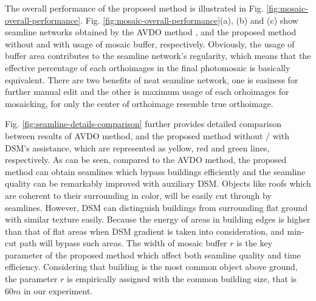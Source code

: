 \documentclass[journal]{IEEEtran}
\begin{document}
The overall performance of the proposed method is illustrated in Fig. \ref{fig:mosaic-overall-performance}. Fig. \ref{fig:mosaic-overall-performance}(a), (b) and (c) show seamline networks obtained by the AVDO method \cite{Pan2009}, and the proposed method without and with usage of mosaic buffer, respectively. Obviously, the usage of buffer area contributes to the seamline network's regularity, which means that the effective percentage of each orthoimages in the final photomosaic is basically equivalent. There are two benefits of neat seamline network, one is easiness for further manual edit and the other is maximum usage of each orhoimages for mosaicking, for only the center of orthoimage resemble true orthoimage.

Fig. \ref{fig:seamline-details-comparison} further provides detailed comparison between results of AVDO method, and the proposed method without / with DSM's assistance, which are represented as yellow, red and green lines, respectively. As can be seen, compared to the AVDO method, the proposed method can obtain seamlines which bypass buildings efficiently and the seamline quality can be remarkably improved with auxiliary DSM. Objects like roofs which are coherent to their surrounding in color, will be easily cut through by seamlines. However, DSM can distinguish buildings from surrounding flat ground with similar texture easily. Because the energy of areas in building edges is higher than that of flat areas when DSM gradient is taken into consideration, and min-cut path will bypass such areas. The width of mosaic buffer $r$ is the key parameter of the proposed method which affect both seamline quality and time efficiency. Considering that building is the most common object above ground, the parameter $r$ is empirically assigned with the common building size, that is $60 m$ in our experiment.
\end{document}
